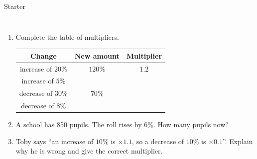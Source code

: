 \documentclass{beamer}
\renewcommand{\arraystretch}{0.92}
\newcommand{\ablank}[1]{%
  \alt<2>{\textcolor{red}{#1}}{\underline{\phantom{#1}}}%
}
\newcommand{\ashow}[1]{\uncover<2->{\textcolor{red}{\small #1}}}
\newcommand{\tightlist}{%
  \setlength{\itemsep}{0pt}\setlength{\parskip}{0pt}\setlength{\topsep}{0pt}%
}
\begin{document}
\begin{frame}[t]{Starter}
\begin{columns}[T]
\vspace{-1.8em}
\footnotesize
\begin{enumerate}\tightlist
{}
  \item Complete the table of multipliers.
  \vspace{0.3em}
  \begin{center}
  {\renewcommand{\arraystretch}{1.25}\setlength{\tabcolsep}{6pt}
  \begin{tabular}{c|c|c}
    Change & New amount & Multiplier\\ \hline
    increase of $20\%$ & $120\%$ & $1.2$\\
    increase of $5\%$  & \ablank{$105\%$} & \ablank{$1.05$}\\
    decrease of $30\%$ & $70\%$  & \ablank{$0.7$}\\
    decrease of $8\%$  & \ablank{$92\%$} & \ablank{$0.92$}
  \end{tabular}}
  \end{center}
  \vspace{0.4em}
  \item A school has 850 pupils. The roll rises by $6\%$. How many pupils now?
        \ashow{$850\times1.06=901$ pupils}
  \item Toby says ``an increase of $10\%$ is $\times1.1$, so a decrease of $10\%$ is $\times0.1$''.
        Explain why he is wrong and give the correct multiplier.
        \ashow{$\times0.1$ leaves only $10\%$, a decrease of $90\%$. A decrease of $10\%$ leaves $90\%$, so $\times0.9$.}
\end{enumerate}
\end{columns}
\end{frame}
\end{document}
